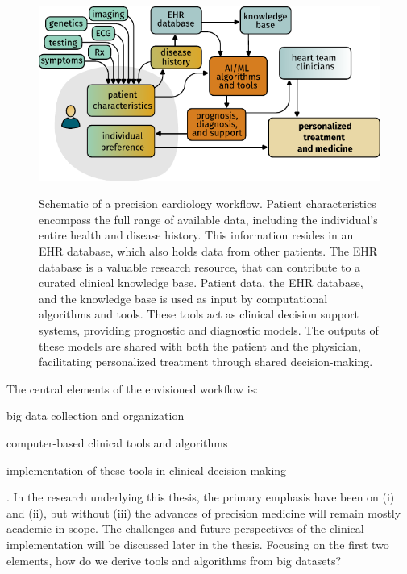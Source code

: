 \begin{figure}[bth]
    \vspace{1em}
    \caption[Schematic of Precision Cardiology]{%
    Schematic of a precision cardiology workflow.
    Patient characteristics encompass the full range of available data,
    including the individual's entire health and disease history.
    This information resides in an \ac{EHR} database, 
    which also holds data from other patients. 
    The \ac{EHR} database is a valuable research resource, 
    that can contribute to a curated clinical knowledge base. 
    Patient data, the \ac{EHR} database, 
    and the knowledge base is used as input 
    by computational algorithms and tools. 
    These tools act as clinical decision support systems, 
    providing prognostic and diagnostic models. 
    The outputs of these models 
    are shared with both the patient and the physician, 
    facilitating personalized treatment 
    through shared decision-making.%
    }
	\includegraphics{graphics/precision-cardiology}
    \label{fig:precision-cardiology}
    \vspace{-3em}
\end{figure}

The central elements of the envisioned workflow is:
\begin{enumerate*}
    \item big data collection and organization
    \item computer-based clinical tools and algorithms
    \item implementation of these tools in clinical decision making
\end{enumerate*}.
In the research underlying this thesis, 
the primary emphasis have been on (i) and (ii),
but without (iii) the advances of precision medicine
will remain mostly academic in scope.
The challenges and future perspectives of the clinical implementation
will be discussed later in the thesis.
Focusing on the first two elements, 
how do we derive tools and algorithms from big datasets?

